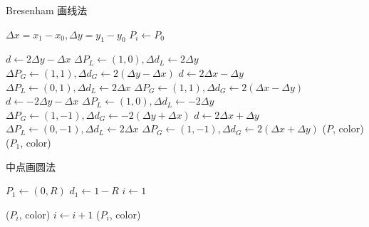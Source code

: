 \documentclass[a4paper]{article}
\begin{document}
\begin{algorithm}
    \caption{Bresenham 画线法}

    \BlankLine

    $\Delta x = x_1-x_0, \Delta y = y_1-y_0$\;
    $P_i\leftarrow P_0$\;

    {
        $d\leftarrow 2\Delta y-\Delta x$\;
        $\Delta P_L \leftarrow (1,0), \Delta d_L \leftarrow 2\Delta y$\;
        $\Delta P_G \leftarrow (1,1), \Delta d_G \leftarrow 2(\Delta y - \Delta x)$\;
    }
    {
        $d\leftarrow 2\Delta x-\Delta y$\;
        $\Delta P_L \leftarrow (0,1), \Delta d_L \leftarrow 2\Delta x$\;
        $\Delta P_G \leftarrow (1,1), \Delta d_G \leftarrow 2(\Delta x - \Delta y)$\;
    }
    \uElseIf{$k\in[-1,0)$}
    {
    $d\leftarrow -2\Delta y-\Delta x$\;
    $\Delta P_L \leftarrow (1,0), \Delta d_L \leftarrow -2\Delta y$\;
    $\Delta P_G \leftarrow (1,-1), \Delta d_G \leftarrow -2(\Delta y + \Delta x)$\;
    }
    \Else
    {
        $d\leftarrow 2\Delta x+\Delta y$\;
        $\Delta P_L \leftarrow (0,-1), \Delta d_L \leftarrow 2\Delta x$\;
        $\Delta P_G \leftarrow (1,-1), \Delta d_G \leftarrow 2(\Delta x + \Delta y)$\;
    }
    {
        \putpixel($P$, color)\;
    }
    \putpixel($P_1$, color)\;
\end{algorithm}

\begin{algorithm}
    \caption{中点画圆法}

    \BlankLine

    $P_1\leftarrow (0,R)$\;
    $d_1\leftarrow 1-R$\;
    $i\leftarrow 1$\;

    {
        \DrawCirclePoints($P_i$, color)\;
        $i\leftarrow i+1$\;
    }
    \DrawCirclePoints($P_i$, color)\;
\end{algorithm}
\end{document}
